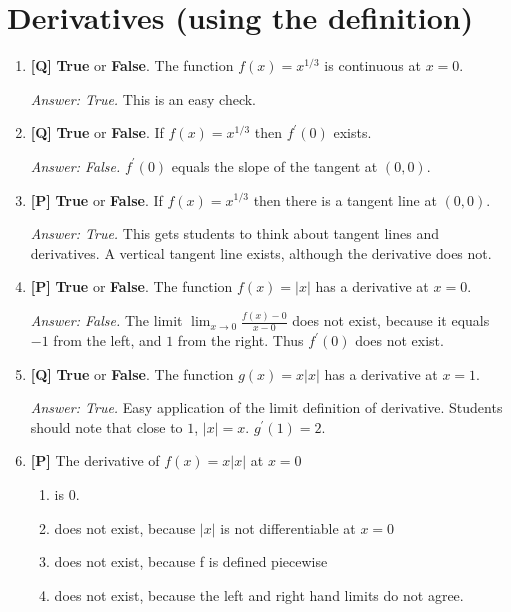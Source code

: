 \documentclass[12pt]{article}
\begin{document}
\section{Derivatives (using the definition)}
\begin{enumerate}

\item {\bf [Q]} \textbf{True} or \textbf{False}.  The function 
$f(x)=x^{1/3}$ is continuous at $x=0$.

{\it Answer: True.} This is an easy check.

\bigskip

\item {\bf [Q]} \textbf{True} or \textbf{False}.  If
$f(x)=x^{1/3}$ then $f^{\prime}(0)$ exists.

{\it Answer: False.} $f^{\prime}(0)$ equals the slope of the tangent at 
$(0,0)$. 

\bigskip

\item {\bf [P]} \textbf{True} or \textbf{False}.  If
$f(x)=x^{1/3}$ then there is a tangent line at $(0,0)$.

{\it Answer: True.} This gets students to think about tangent lines
and derivatives.  A vertical tangent line exists, although the derivative
does not.

\bigskip

\item {\bf [P]} \textbf{True} or \textbf{False}.  The function $f(x)=|x|$ 
has a derivative at $x=0$.

{\it Answer: False.} The limit $\displaystyle{\lim_{x\rightarrow 0}
\frac{f(x)-0}{x-0}}$ does not exist, because it equals $-1$ from the 
left, and $1$ from the right. Thus $f^{\prime}(0)$ does not exist.

\bigskip

\item {\bf [Q]} \textbf{True} or \textbf{False}.  The function $g(x)=x|x|$ has a derivative at $x=1$.

{\it Answer: True.} Easy application of the limit definition of derivative. Students should note that close to $1$, $|x|=x$. $g^{\prime}(1)=2$.

\bigskip

\item {\bf [P]} The derivative of $f(x)=x|x|$ at $x=0$
\begin{enumerate}
\item is 0. 
\item does not exist, because $|x|$ is not differentiable at $x=0$ 
\item does not exist, because f is defined piecewise
\item does not exist, because the left and right hand limits do not agree.
\end{enumerate}


\end{enumerate}
\end{document}
